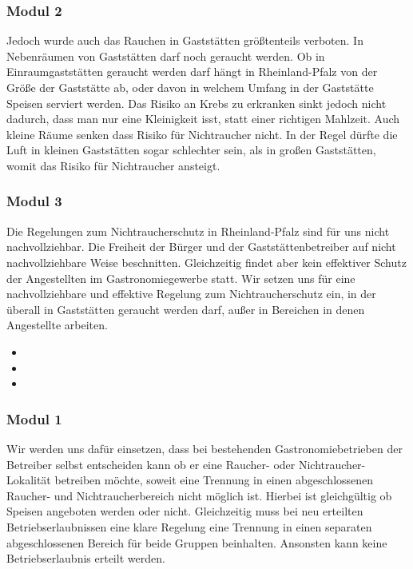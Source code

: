 \subsubsection{Modul 2}
\abstimmung
Jedoch wurde auch das Rauchen in Gaststätten größtenteils verboten. In Nebenräumen von Gaststätten darf noch geraucht werden. Ob in Einraumgaststätten geraucht werden darf hängt in Rheinland-Pfalz von der Größe der Gaststätte ab, oder davon in welchem Umfang in der Gaststätte Speisen serviert werden. Das Risiko an Krebs zu erkranken sinkt jedoch nicht dadurch, dass man nur eine Kleinigkeit isst, statt einer richtigen Mahlzeit. Auch kleine Räume senken dass Risiko für Nichtraucher nicht. In der Regel dürfte die Luft in kleinen Gaststätten sogar schlechter sein, als in großen Gaststätten, womit das Risiko für Nichtraucher ansteigt.

\subsubsection{Modul 3}
\abstimmung
Die Regelungen zum Nichtraucherschutz in Rheinland-Pfalz sind für uns nicht nachvollziehbar. Die Freiheit der Bürger und der Gaststättenbetreiber auf nicht nachvollziehbare Weise beschnitten. Gleichzeitig findet aber kein effektiver Schutz der Angestellten im Gastronomiegewerbe statt. Wir setzen uns für eine nachvollziehbare und effektive Regelung zum Nichtraucherschutz ein, in der überall in Gaststätten geraucht werden darf, außer in Bereichen in denen Angestellte arbeiten.
 
\label{wp:selbst:raucher2}
\begin{itemize}
\item {}
\item {}
\item {}
\end{itemize}

\subsubsection{Modul 1}
\abstimmung
Wir werden uns dafür einsetzen, dass bei bestehenden Gastronomiebetrieben der Betreiber selbst entscheiden kann ob er eine Raucher- oder Nichtraucher- Lokalität betreiben möchte, soweit eine Trennung in einen abgeschlossenen Raucher- und Nichtraucherbereich nicht möglich ist. Hierbei ist gleichgültig ob Speisen angeboten werden oder nicht. Gleichzeitig muss bei neu erteilten Betriebserlaubnissen eine klare Regelung eine Trennung in einen separaten abgeschlossenen Bereich für beide Gruppen beinhalten. Ansonsten kann keine Betriebserlaubnis erteilt werden.

